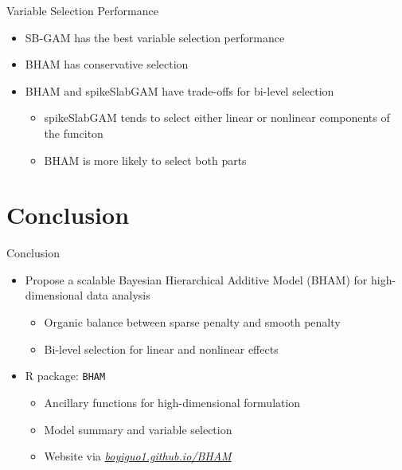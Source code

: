 \documentclass[
  ignorenonframetext,
  aspectratio=169]{beamer}
\providecommand{\tightlist}{%
  \setlength{\itemsep}{0pt}\setlength{\parskip}{0pt}}
\begin{document}
\begin{frame}{Variable Selection Performance}
\protect\hypertarget{variable-selection-performance}{}
\begin{itemize}
\tightlist
\item
  SB-GAM has the best variable selection performance
\item
  BHAM has conservative selection
\item
  BHAM and spikeSlabGAM have trade-offs for bi-level selection

  \begin{itemize}
  \tightlist
  \item
    spikeSlabGAM tends to select either linear or nonlinear components
    of the funciton
  \item
    BHAM is more likely to select both parts
  \end{itemize}
\end{itemize}
\end{frame}

\hypertarget{conclusion}{%
\section{Conclusion}\label{conclusion}}

\begin{frame}{Conclusion}
\begin{itemize}
\tightlist
\item
  Propose a scalable Bayesian Hierarchical Additive Model (BHAM) for
  high-dimensional data analysis

  \begin{itemize}
  \tightlist
  \item
    Organic balance between sparse penalty and smooth penalty
  \item
    Bi-level selection for linear and nonlinear effects
  \end{itemize}
\item
  R package: \texttt{BHAM}

  \begin{itemize}
  \tightlist
  \item
    Ancillary functions for high-dimensional formulation
  \item
    Model summary and variable selection
  \item
    Website via
    \href{https://boyiguo1.github.io/BHAM/}{\emph{boyiguo1.github.io/BHAM}}
  \end{itemize}
\end{itemize}
\end{frame}
\end{document}

